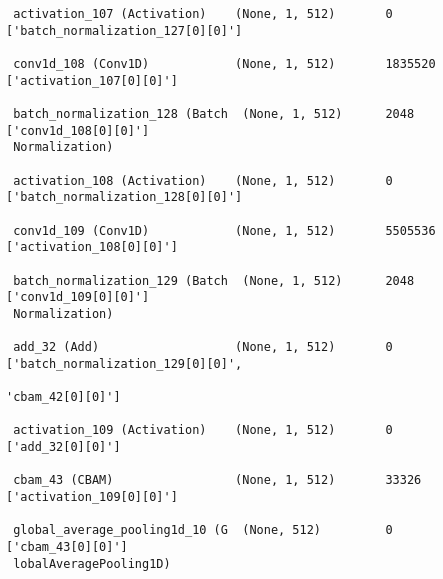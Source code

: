 \begin{lstlisting}
 activation_107 (Activation)    (None, 1, 512)       0           ['batch_normalization_127[0][0]']
                                                                                                  
 conv1d_108 (Conv1D)            (None, 1, 512)       1835520     ['activation_107[0][0]']         
                                                                                                  
 batch_normalization_128 (Batch  (None, 1, 512)      2048        ['conv1d_108[0][0]']             
 Normalization)                                                                                   
                                                                                                  
 activation_108 (Activation)    (None, 1, 512)       0           ['batch_normalization_128[0][0]']
                                                                                                  
 conv1d_109 (Conv1D)            (None, 1, 512)       5505536     ['activation_108[0][0]']         
                                                                                                  
 batch_normalization_129 (Batch  (None, 1, 512)      2048        ['conv1d_109[0][0]']             
 Normalization)                                                                                   
                                                                                                  
 add_32 (Add)                   (None, 1, 512)       0           ['batch_normalization_129[0][0]',
                                                                  'cbam_42[0][0]']                
                                                                                                  
 activation_109 (Activation)    (None, 1, 512)       0           ['add_32[0][0]']                 
                                                                                                  
 cbam_43 (CBAM)                 (None, 1, 512)       33326       ['activation_109[0][0]']         
                                                                                                  
 global_average_pooling1d_10 (G  (None, 512)         0           ['cbam_43[0][0]']                
 lobalAveragePooling1D)                                                                           
                                                                                                  

\end{lstlisting}
